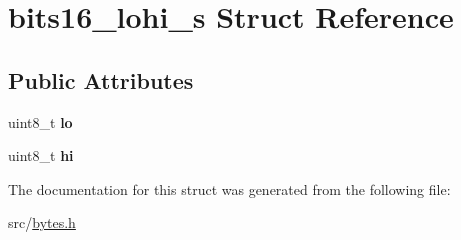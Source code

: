 \hypertarget{structbits16__lohi__s}{}\section{bits16\+\_\+lohi\+\_\+s Struct Reference}
\label{structbits16__lohi__s}
\subsection*{Public Attributes}
\begin{DoxyCompactItemize}
\item 
\hypertarget{structbits16__lohi__s_ad0b319bb03b45d532afee478c17d54cb}{}\label{structbits16__lohi__s_ad0b319bb03b45d532afee478c17d54cb} 
uint8\+\_\+t {\bfseries lo}
\item 
\hypertarget{structbits16__lohi__s_ac965f4c8b992ff605dd2dd2ec494a456}{}\label{structbits16__lohi__s_ac965f4c8b992ff605dd2dd2ec494a456} 
uint8\+\_\+t {\bfseries hi}
\end{DoxyCompactItemize}


The documentation for this struct was generated from the following file\+:\begin{DoxyCompactItemize}
\item 
src/\hyperlink{bytes_8h}{bytes.\+h}\end{DoxyCompactItemize}
